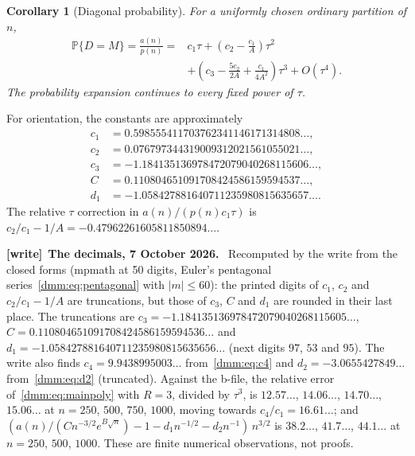 \documentclass[11pt,letterpaper]{article}
\numberwithin{equation}{section}
\newtheorem{corollary}[theorem]{Corollary}
\theoremstyle{definition}\newtheorem{definition}[theorem]{Definition}
\theoremstyle{remark}\newtheorem{remark}[theorem]{Remark}
\newcommand{\Prob}{\mathbb P}
\newenvironment{writenote}[1][]{\par\smallskip\begingroup\small
 \noindent\textbf{[write]}\if\relax\detokenize{#1}\relax\else~\textbf{#1.}\fi\ }%
 {\par\endgroup\smallskip}
\begin{document}
\begin{corollary}[Diagonal probability]\label{dmm:cor:prob}
For a uniformly chosen ordinary partition of $n$,
\begin{align}\label{dmm:eq:probability}
\Prob\{D=M\}=\frac{a(n)}{p(n)}
={}&c_1\tau+\left(c_2-\frac{c_1}{A}\right)\tau^2\\
&+\left(c_3-\frac{5c_2}{2A}+\frac{c_1}{4A^2}\right)\tau^3
+O(\tau^4).\nonumber
\end{align}
The probability expansion continues to every fixed power of $\tau$.
\end{corollary}
For orientation, the constants are approximately
\begin{align}\label{dmm:eq:numerics}
c_1&=0.598555411703762341146171314808\ldots,\nonumber\\
c_2&=0.076797344319009312021561055021\ldots,\nonumber\\
c_3&=-1.184135136978472079040268115606\ldots,\\
C&=0.110804651091708424586159594537\ldots,\nonumber\\
d_1&=-1.058427881640711235980815635657\ldots.\nonumber
\end{align}
The relative $\tau$ correction in $a(n)/(p(n)c_1\tau)$ is
$c_2/c_1-1/A=-0.47962261605811850894\ldots$.
\begin{writenote}[The decimals, 7 October 2026]
Recomputed by the write from the closed forms (mpmath at 50 digits, Euler's
pentagonal series~\eqref{dmm:eq:pentagonal} with $|m|\le60$): the printed
digits of $c_1$, $c_2$ and $c_2/c_1-1/A$ are truncations, but those of
$c_3$, $C$ and $d_1$ are rounded in their last place. The truncations are
$c_3=-1.184135136978472079040268115605\ldots$,
$C=0.110804651091708424586159594536\ldots$ and
$d_1=-1.058427881640711235980815635656\ldots$ (next digits $97$, $53$ and
$95$). The write also finds $c_4=9.9438995003\ldots$ from~\eqref{dmm:eq:c4}
and $d_2=-3.0655427849\ldots$ from~\eqref{dmm:eq:d2} (truncated). Against the
b-file, the relative error of~\eqref{dmm:eq:mainpoly} with $R=3$, divided by
$\tau^3$, is $12.57\ldots$, $14.06\ldots$, $14.70\ldots$, $15.06\ldots$ at
$n=250$, $500$, $750$, $1000$, moving towards $c_4/c_1=16.61\ldots$; and
$(a(n)/(Cn^{-3/2}e^{B\sqrt n})-1-d_1n^{-1/2}-d_2n^{-1})\,n^{3/2}$ is
$38.2\ldots$, $41.7\ldots$, $44.1\ldots$ at $n=250$, $500$, $1000$. These are
finite numerical observations, not proofs.
\end{writenote}
\end{document}
